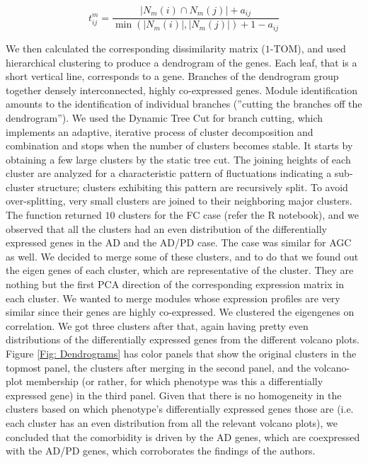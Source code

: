 \[t_{ij}^m = \frac{|N_m(i) \cap N_m(j)| + a_{ij}}{\min (|N_m(i)|, |N_m(j)|) + 1 -a_{ij}} \]

We then calculated the corresponding dissimilarity matrix ($1$-TOM), and used hierarchical clustering to produce a dendrogram of the genes. Each leaf, that is a short vertical line, corresponds to a gene. Branches of the dendrogram group together densely interconnected, highly co-expressed genes. Module identification amounts to the identification of individual branches (”cutting the branches off the dendrogram”). We used the Dynamic Tree Cut for branch cutting, which implements an adaptive, iterative process of cluster decomposition and combination and
stops when the number of clusters becomes stable. It starts by obtaining a few large clusters by the static tree cut. The joining heights of each cluster are analyzed for a characteristic pattern of fluctuations  indicating a sub-cluster structure; clusters exhibiting this pattern are recursively split. To avoid over-splitting, very small clusters are joined to their neighboring major clusters.\\

The function returned $10$ clusters for the FC case (refer the R notebook), and we observed that all the clusters had an even distribution of the differentially expressed genes in the AD and the AD/PD case. The case was similar for AGC as well. We decided to merge some of these clusters, and to do that we found out the eigen genes of each cluster, which are representative of the cluster. They are nothing but the first PCA direction of the corresponding expression matrix in each cluster. We wanted to merge modules whose expression profiles are very similar since their genes are highly co-expressed. We clustered the eigengenes on correlation. We got three clusters after that, again having pretty even distributions of the differentially expressed genes from the different volcano plots. Figure \ref{Fig: Dendrograms} has color panels that show the original clusters in the topmost panel, the clusters after merging in the second panel, and the volcano-plot membership (or rather, for which phenotype was this a differentially expressed gene) in the third panel. Given that there is no homogeneity in the clusters based on which phenotype's differentially expressed genes those are (i.e. each cluster has an even distribution from all the relevant volcano plots), we concluded that the comorbidity is driven by the AD genes, which are coexpressed with the AD/PD genes, which corroborates the findings of the authors.\\

